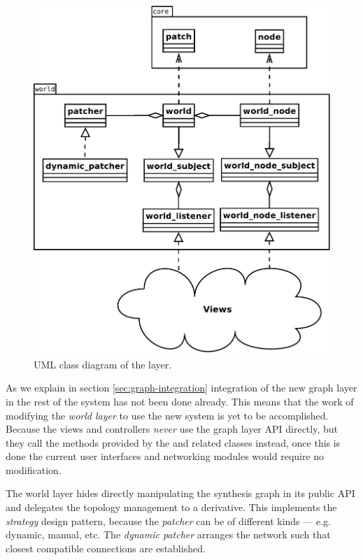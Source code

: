 \begin{figure}[h!]
  \centering
  \includegraphics[width=\textwidth]{pic/world.pdf}
  \caption{UML class diagram of the  layer.}
  \label{fig:world}
\end{figure}

As we explain in section \ref{sec:graph-integration} integration
of the new graph layer in the rest of the system has not been done
already. This means that the work of modifying the \emph{world layer}
to use the new system is yet to be accomplished. Because the views and
controllers \emph{never} use the graph layer API directly, but they
call the methods provided by the  and related classes
instead, once this is done the current user interfaces and networking
modules would require no modification.

The world layer hides directly manipulating the synthesis graph in its
public API and delegates the topology management to a 
derivative. This implements the \emph{strategy} design pattern,
because the \emph{patcher} can be of different kinds --- e.g. dynamic,
manual, etc. The \emph{dynamic patcher} arranges the network such that
closest compatible connections are established.

